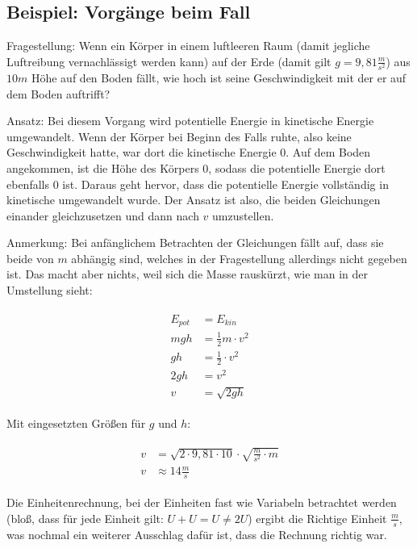 \subsection{Beispiel: Vorgänge beim Fall}

Fragestellung: Wenn ein Körper in einem luftleeren Raum (damit jegliche Luftreibung vernachlässigt werden kann) auf der Erde (damit gilt $g=9,81\frac{m}{s^2}$) aus $10m$ Höhe auf den Boden fällt, wie hoch ist seine Geschwindigkeit mit der er auf dem Boden auftrifft?

Ansatz: Bei diesem Vorgang wird potentielle Energie in kinetische Energie umgewandelt. Wenn der Körper bei Beginn des Falls ruhte, also keine Geschwindigkeit hatte, war dort die kinetische Energie $0$. Auf dem Boden angekommen, ist die Höhe des Körpers $0$, sodass die potentielle Energie dort ebenfalls $0$ ist. Daraus geht hervor, dass die potentielle Energie vollständig in kinetische umgewandelt wurde. Der Ansatz ist also, die beiden Gleichungen einander gleichzusetzen und dann nach $v$ umzustellen.

Anmerkung: Bei anfänglichem Betrachten der Gleichungen fällt auf, dass sie beide von $m$ abhängig sind, welches in der Fragestellung allerdings nicht gegeben ist. Das macht aber nichts, weil sich die Masse \glqq rauskürzt\grqq , wie man in der Umstellung sieht:

\begin{align}
\begin{split}
	E_{pot} &= E_{kin} \\
	mgh &= \frac{1}{2}m \cdot v^2 \\
	gh &= \frac{1}{2} \cdot v^2 \\
	2gh &= v^2 \\
	v &= \sqrt{2gh}
\end{split}
\end{align}

\noindent Mit eingesetzten Größen für $g$ und $h$:

\begin{align}
\begin{split}
	v &= \sqrt{2 \cdot 9,81 \cdot 10} \cdot \sqrt{\frac{m}{s^2} \cdot m} \\
	v &\approx 14 \frac{m}{s}
\end{split}
\end{align}

Die Einheitenrechnung, bei der Einheiten fast wie Variabeln betrachtet werden (bloß, dass für jede Einheit gilt: $U+U=U \neq 2U$) ergibt die Richtige Einheit $\frac{m}{s}$, was nochmal ein weiterer Ausschlag dafür ist, dass die Rechnung richtig war.





